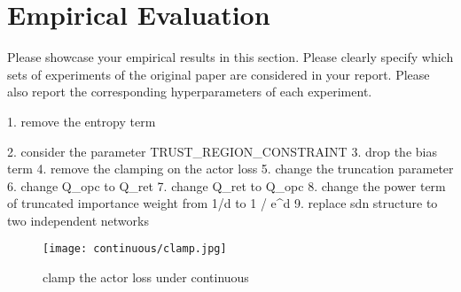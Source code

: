 \section{Empirical Evaluation}
\label{section:evaluation}
Please showcase your empirical results in this section. Please clearly specify which sets of experiments of the original paper are considered in your report. Please also report the corresponding hyperparameters of each experiment.


1. remove the entropy term

2. consider the parameter TRUST_REGION_CONSTRAINT
3. drop the bias term 
4. remove the clamping on the actor loss
5. change the truncation parameter
6. change Q_opc to Q_ret 
7. change Q_ret to Q_opc
8. change the power term of truncated importance weight from 1/d to 1 / e^d 
9. replace sdn structure to two independent networks


\begin{figure}
\caption{clamp the actor loss under continuous}
\texttt{[image: continuous/clamp.jpg]}
\end{figure}
    